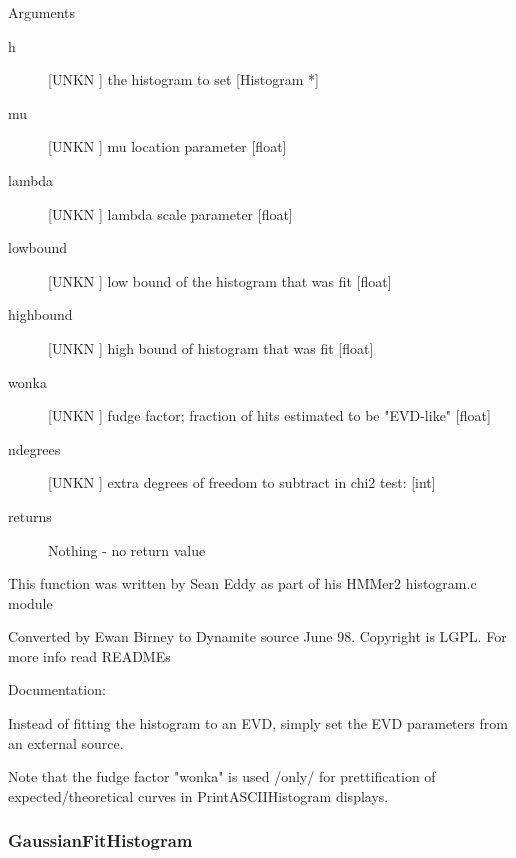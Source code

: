 Arguments
\begin{description}
\item[h] [UNKN ] the histogram to set [Histogram *]
\item[mu] [UNKN ] mu location parameter                 [float]
\item[lambda] [UNKN ] lambda scale parameter [float]
\item[lowbound] [UNKN ] low bound of the histogram that was fit [float]
\item[highbound] [UNKN ] high bound of histogram that was fit [float]
\item[wonka] [UNKN ] fudge factor; fraction of hits estimated to be "EVD-like" [float]
\item[ndegrees] [UNKN ] extra degrees of freedom to subtract in chi2 test: [int]
\item[returns] Nothing - no return value
\end{description}


This function was written by Sean Eddy
as part of his HMMer2 histogram.c module


Converted by Ewan Birney to Dynamite source June 98.
Copyright is LGPL. For more info read READMEs


Documentation:


Instead of fitting the histogram to an EVD,
simply set the EVD parameters from an external source.


Note that the fudge factor "wonka" is used /only/
for prettification of expected/theoretical curves
in PrintASCIIHistogram displays.




\subsubsection{GaussianFitHistogram}

